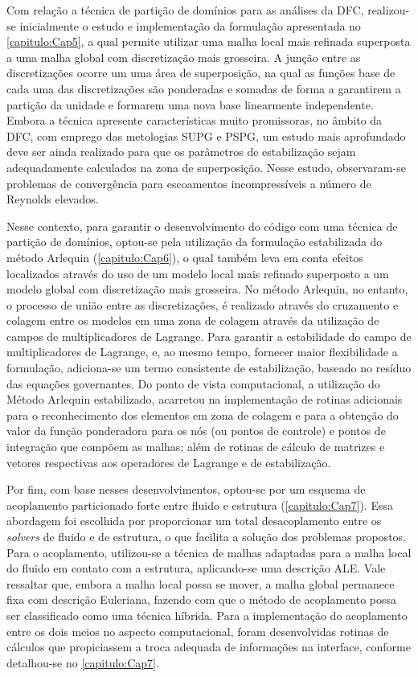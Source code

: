 Com relação a técnica de partição de domínios para as análises da DFC, realizou-se inicialmente o estudo e implementação da formulação apresentada no \autoref{capitulo:Cap5}, a qual permite utilizar uma malha local mais refinada superposta a uma malha global com discretização mais grosseira. A junção entre as discretizações ocorre um uma área de superposição, na qual as funções base de cada uma das discretizações são ponderadas e somadas de forma a garantirem a partição da unidade e formarem uma nova base linearmente independente. Embora a técnica apresente características muito promissoras, no âmbito da DFC, com emprego das metologias SUPG e PSPG, um estudo mais aprofundado deve ser ainda realizado para que os parâmetros de estabilização sejam adequadamente calculados na zona de superposição. Nesse estudo, observaram-se problemas de convergência para escoamentos incompressíveis a número de Reynolds elevados.

Nesse contexto, para garantir o desenvolvimento do código com uma técnica de partição de domínios, optou-se pela utilização da formulação estabilizada do método Arlequin (\autoref{capitulo:Cap6}), o qual também leva em conta efeitos localizados através do uso de um modelo local mais refinado superposto a um modelo global com discretização mais grosseira. No método Arlequin, no entanto, o processo de união entre as discretizações, é realizado através do cruzamento e colagem entre os modelos em uma zona de colagem através da utilização de campos de multiplicadores de Lagrange. Para garantir a estabilidade do campo de multiplicadores de Lagrange, e, ao mesmo tempo, fornecer maior flexibilidade a formulação, adiciona-se um termo consistente de estabilização, baseado no resíduo das equações governantes. Do ponto de vista computacional, a utilização do Método Arlequin estabilizado, acarretou na implementação de rotinas adicionais para o reconhecimento dos elementos em zona de colagem e para a obtenção do valor da função ponderadora para os nós (ou pontos de controle) e pontos de integração que compõem as malhas; além de rotinas de cálculo de matrizes e vetores respectivas aos operadores de Lagrange e de estabilização.

Por fim, com base nesses desenvolvimentos, optou-se por um esquema de acoplamento particionado forte entre fluido e estrutura (\autoref{capitulo:Cap7}). Essa abordagem foi escolhida por proporcionar um total desacoplamento entre os \textit{solvers} de fluido e de estrutura, o que facilita a solução dos problemas propostos. Para o acoplamento, utilizou-se a técnica de malhas adaptadas para a malha local do fluido em contato com a estrutura, aplicando-se uma descrição ALE. Vale ressaltar que, embora a malha local possa se mover, a malha global permanece fixa com descrição Euleriana, fazendo com que o método de acoplamento possa ser classificado como uma técnica híbrida. Para a implementação do acoplamento entre os dois meios no aspecto computacional, foram desenvolvidas rotinas de cálculos que propiciassem a troca adequada de informações na interface, conforme detalhou-se no \autoref{capitulo:Cap7}. 

